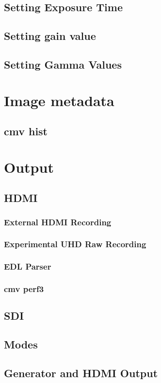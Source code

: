 \documentclass{article}
\begin{document}
\subsection{Setting Exposure Time}
\subsection{Setting gain value}
\subsection{Setting Gamma Values}

\section{Image metadata}
\subsection{cmv hist}

\section{Output}
\subsection{HDMI}
\subsubsection{External HDMI Recording}
\subsubsection{Experimental UHD Raw Recording}
\subsubsection{EDL Parser}
\subsubsection{cmv perf3}
\subsection{SDI}
\subsection{Modes}
\subsection{Generator and HDMI Output}
\end{document}
